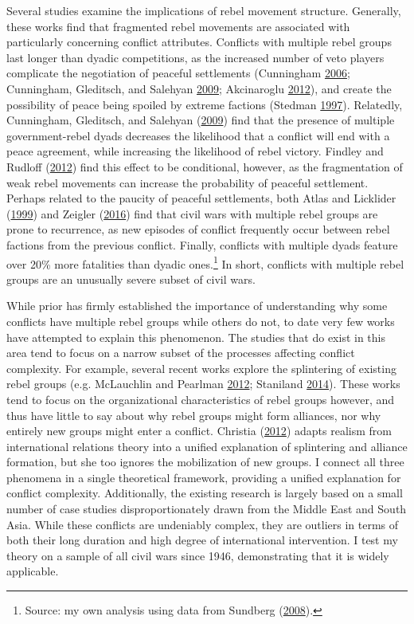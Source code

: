 \documentclass[12pt,]{book}
\let\rmarkdownfootnote\footnote%
\def\footnote{\protect\rmarkdownfootnote}
\theoremstyle{definition}
\theoremstyle{definition}
\theoremstyle{remark}
\begin{document}
Several studies examine the implications of rebel movement structure.
Generally, these works find that fragmented rebel movements are
associated with particularly concerning conflict attributes. Conflicts
with multiple rebel groups last longer than dyadic competitions, as the
increased number of veto players complicate the negotiation of peaceful
settlements (Cunningham \protect\hyperlink{ref-Cunningham2006}{2006};
Cunningham, Gleditsch, and Salehyan
\protect\hyperlink{ref-Cunningham2009}{2009}; Akcinaroglu
\protect\hyperlink{ref-Akcinaroglu2012a}{2012}), and create the
possibility of peace being spoiled by extreme factions (Stedman
\protect\hyperlink{ref-Stedman1997}{1997}). Relatedly, Cunningham,
Gleditsch, and Salehyan (\protect\hyperlink{ref-Cunningham2009}{2009})
find that the presence of multiple government-rebel dyads decreases the
likelihood that a conflict will end with a peace agreement, while
increasing the likelihood of rebel victory. Findley and Rudloff
(\protect\hyperlink{ref-Findley2012}{2012}) find this effect to be
conditional, however, as the fragmentation of weak rebel movements can
increase the probability of peaceful settlement. Perhaps related to the
paucity of peaceful settlements, both Atlas and Licklider
(\protect\hyperlink{ref-Atlas1999}{1999}) and Zeigler
(\protect\hyperlink{ref-Zeigler2016}{2016}) find that civil wars with
multiple rebel groups are prone to recurrence, as new episodes of
conflict frequently occur between rebel factions from the previous
conflict. Finally, conflicts with multiple dyads feature over 20\% more
fatalities than dyadic ones.\footnote{Source: my own analysis using data
  from Sundberg (\protect\hyperlink{ref-Sundberg2008a}{2008}).} In
short, conflicts with multiple rebel groups are an unusually severe
subset of civil wars.

While prior has firmly established the importance of understanding why
some conflicts have multiple rebel groups while others do not, to date
very few works have attempted to explain this phenomenon. The studies
that do exist in this area tend to focus on a narrow subset of the
processes affecting conflict complexity. For example, several recent
works explore the splintering of existing rebel groups (e.g. McLauchlin
and Pearlman \protect\hyperlink{ref-McLauchlin2012}{2012}; Staniland
\protect\hyperlink{ref-Staniland2014}{2014}). These works tend to focus
on the organizational characteristics of rebel groups however, and thus
have little to say about why rebel groups might form alliances, nor why
entirely new groups might enter a conflict. Christia
(\protect\hyperlink{ref-Christia2012}{2012}) adapts realism from
international relations theory into a unified explanation of splintering
and alliance formation, but she too ignores the mobilization of new
groups. I connect all three phenomena in a single theoretical framework,
providing a unified explanation for conflict complexity. Additionally,
the existing research is largely based on a small number of case studies
disproportionately drawn from the Middle East and South Asia. While
these conflicts are undeniably complex, they are outliers in terms of
both their long duration and high degree of international intervention.
I test my theory on a sample of all civil wars since 1946, demonstrating
that it is widely applicable.
\end{document}

